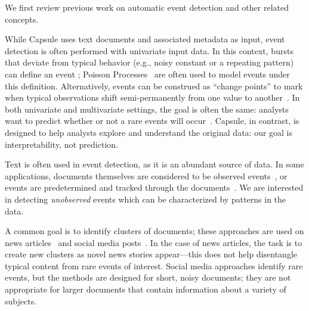 

  We first review previous work on automatic event detection and other related concepts.  

While Capsule uses text documents and associated metadata as input, event detection is often performed with univariate input data.  In this context, bursts that deviate from typical behavior (e.g., noisy constant or a repeating pattern) can define an event \cite{kleinberg2003bursty,ihler2007learning}; Poisson Processes~\cite{Kingman:1993} are often used to model events under this definition.  Alternatively, events can be construed as ``change points'' to mark when typical observations shift semi-permanently from one value to another~\cite{guralnik1999event}.
In both univariate and multivariate settings, the goal is often the same: analysts want to predict whether or not a rare events will occur~\cite{weiss1998learning,das2008anomaly}.  Capsule, in contrast, is designed to help analysts explore and understand the original data: our goal is interpretability, not prediction.

Text is often used in event detection, as it is an abundant source of data.  
In some applications, documents themselves are considered to be observed events~\cite{mccallum1998comparison,peng2007event}, or events are predetermined and tracked through the documents~\cite{yang2000improving,VanDam:2012}.  We are interested in detecting \emph{unobserved} events which can be characterized by patterns in the data.

A common goal is to identify clusters of documents; these approaches are used on news articles~\cite{zhao2012novel,zhao2007temporal,zhang2002novelty,li2005probabilistic,wang2007mining,allan1998line} and social media posts~\cite{VanDam:2012,lau2012line,jackoway2011identification,sakaki2010earthquake,reuter2012event,becker2010learning,sayyadi2009event}.  
In the case of news articles, the task is to create new clusters as novel news stories appear---this does not help disentangle typical content from rare events of interest.
Social media approaches identify rare events, but the methods are designed for short, noisy documents; they are not appropriate for larger documents that contain information about a variety of subjects.

